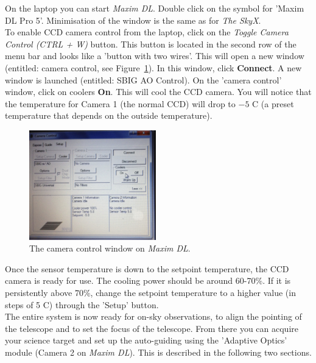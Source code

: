 \documentclass[12pt,twoside,a4paper]{report}
\begin{document}
On the laptop you can start \emph{Maxim DL}. Double click on the symbol for 'Maxim DL Pro 5'. 
Minimisation of the window is the same as for \emph{The SkyX}.\\

To enable CCD camera control from the laptop, click on the \textit{Toggle Camera Control (CTRL + W)} button.
This button is located in the second row of the menu bar and looks like a 'button with two wires'. 
This will open a new window (entitled: camera control, see Figure~\ref{fig:coolers}).  
In this window, click \textbf{Connect}. 
A new window is launched (entitled: SBIG AO Control). On the 'camera control' window, click on
coolers \textbf{On}. This will cool the CCD camera. You will notice that the temperature for 
Camera 1 (the normal CCD) will drop to $-5$ C (a preset temperature that depends on the outside 
temperature).\\

\begin{figure}[ht]
 \centering
    \includegraphics[width=0.49\textwidth]{documentation_images/maximdl_cooler}
    \caption{\label{fig:coolers} The camera control window on \emph{Maxim DL}.}
\end{figure}

Once the sensor temperature is down to the setpoint temperature, the CCD camera is ready for use. 
The cooling power should be around 60-70\%. If it is persistently above 70\%, change the setpoint 
temperature to a higher value (in steps of 5 C) through the 'Setup' button.\\

The entire system is now ready for on-sky observations, to align the pointing of the telescope and
to set the focus of the telescope. From there you can acquire your science target and set up the 
auto-guiding using the 'Adaptive Optics' module (Camera 2 on \emph{Maxim DL}). This is described
in the following two sections.
\end{document}
